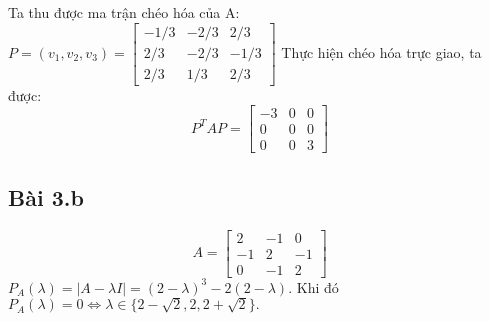 \documentclass{article}
\begin{document}
Ta thu được ma trận chéo hóa của A: \(
P = (v_1, v_2, v_3) = \begin{bmatrix}
    -1/3 & -2/3 & 2/3  \\
    2/3  & -2/3 & -1/3 \\
    2/3  & 1/3  & 2/3
\end{bmatrix} \)
\newline Thực hiện chéo hóa trực giao, ta được:
\[
    P^TAP = \begin{bmatrix}
        -3 & 0 & 0 \\ 0 & 0 & 0 \\ 0 & 0 & 3
    \end{bmatrix}
\]

\subsection*{Bài 3.b}
\[
    A =
    \begin{bmatrix}
        2 & -1 & 0 \\ -1 & 2 & -1 \\ 0 & -1 & 2
    \end{bmatrix}
\]
\( P_A(\lambda) = |A - \lambda I| = (2-\lambda)^3 - 2(2-\lambda). \)
\newline Khi đó \( P_{A}(\lambda) = 0 \Leftrightarrow \lambda \in \{ 2-\sqrt{2}, 2, 2+\sqrt{2} \}. \)
\end{document}
